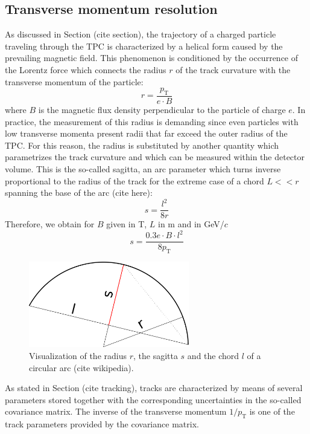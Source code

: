 \documentclass[12pt,a4paper]{report}
\begin{document}
\subsection{Transverse momentum resolution}
As discussed in Section (cite section), the trajectory of a charged particle traveling through the TPC is characterized by a helical form caused by the prevailing magnetic field. This phenomenon is conditioned by the occurrence of the Lorentz force which connects the radius $r$ of the track curvature with the transverse momentum \pt of the particle:
\begin{equation}
r = \dfrac{p_\text{T}}{e\cdot B}
\label{radius}
\end{equation}
where $B$ is the magnetic flux density perpendicular to the particle of charge $e$. In practice, the measurement of this radius is demanding since even particles with low transverse momenta present radii that far exceed the outer radius of the TPC. For this reason, the radius is substituted by another quantity which parametrizes the track curvature and which can be measured within the detector volume. This is the so-called sagitta, an arc parameter which turns inverse proportional to the radius of the track for the extreme case of a chord $L<<r$ spanning the base of the arc (cite here):
\begin{equation}
s = \dfrac{l^2}{8r}
\end{equation}
Therefore, we obtain for $B$ given in T, $L$ in m and \pt in GeV/$c$
\begin{equation}
s = \dfrac{0.3e \cdot B \cdot l^2}{8p_\text{T}}
\end{equation}
\begin{figure}[tb!]
\centering
\includegraphics[width=7cm]{Plots/Sagitta.png}  
\caption{Visualization of the radius $r$, the sagitta $s$ and the chord $l$ of a circular arc (cite wikipedia).}
\label{Sagitta}
\end{figure}
\hspace{-0.25cm} As stated in Section (cite tracking), tracks are characterized by means of several parameters stored together with the corresponding uncertainties in the so-called covariance matrix. The inverse of the transverse momentum $1/p_\text{T}$ is one of the track parameters provided by the covariance matrix.\\
\end{document}
